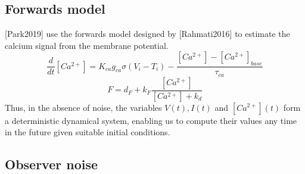 \documentclass[a4paper,10pt]{article}
\begin{document}
\subsection{Forwards model}
[Park2019] use the forwards model designed by [Rahmati2016] to estimate the calcium signal from the membrane potential.
\begin{equation}
   \frac{d}{dt}[Ca^{2+}] = K_{ca} g_{ca} \sigma(V_i - T_i) - \frac{[Ca^{2+}] - [Ca^{2+}]_{base}}{\tau_{ca}}
\end{equation}
\begin{equation}
   F = d_F + k_F \frac{[Ca^{2+}]}{[Ca^{2+}] + k_d}
\end{equation}
Thus, in the absence of noise, the variables $V(t), I(t)$ and $[Ca^{2+}](t)$ form a deterministic dynamical system, enabling us to compute their values any time in the future given suitable initial conditions.

\subsection{Observer noise}
\end{document}
